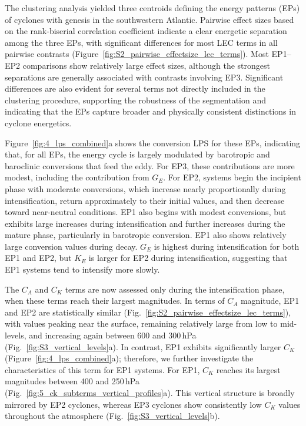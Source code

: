 \documentclass[pdflatex,sn-chicago]{sn-jnl}%
\theoremstyle{plain}
\theoremstyle{definition}
\theoremstyle{remark}
\theoremstyle{definition}
\begin{document}
The clustering analysis yielded three centroids defining the energy patterns (EPs) of cyclones with genesis in the southwestern Atlantic. Pairwise effect sizes based on the rank-biserial correlation coefficient indicate a clear energetic separation among the three EPs, with significant differences for most LEC terms in all pairwise contrasts (Figure~\ref{fig:S2_pairwise_effectsize_lec_terms}). Most EP1--EP2 comparisons show relatively large effect sizes, although the strongest separations are generally associated with contrasts involving EP3. Significant differences are also evident for several terms not directly included in the clustering procedure, supporting the robustness of the segmentation and indicating that the EPs capture broader and physically consistent distinctions in cyclone energetics.

Figure~\ref{fig:4_lps_combined}a shows the conversion LPS for these EPs, indicating that, for all EPs, the energy cycle is largely modulated by barotropic and baroclinic conversions that feed the eddy. For EP3, these contributions are more modest, including the contribution from $G_E$. For EP2, systems begin the incipient phase with moderate conversions, which increase nearly proportionally during intensification, return approximately to their initial values, and then decrease toward near-neutral conditions. EP1 also begins with modest conversions, but exhibits large increases during intensification and further increases during the mature phase, particularly in barotropic conversion. EP1 also shows relatively large conversion values during decay. $G_E$ is highest during intensification for both EP1 and EP2, but $K_E$ is larger for EP2 during intensification, suggesting that EP1 systems tend to intensify more slowly.

The $C_A$ and $C_K$ terms are now assessed only during the intensification phase, when these terms reach their largest magnitudes. In terms of $C_A$ magnitude, EP1 and EP2 are statistically similar (Fig.~\ref{fig:S2_pairwise_effectsize_lec_terms}), with values peaking near the surface, remaining relatively large from low to mid-levels, and increasing again between 600 and 300\,hPa (Fig.~\ref{fig:S3_vertical_levels}a). In contrast, EP1 exhibits significantly larger $C_K$ (Figure~\ref{fig:4_lps_combined}a); therefore, we further investigate the characteristics of this term for EP1 systems. For EP1, $C_K$ reaches its largest magnitudes between 400 and 250\,hPa (Fig.~\ref{fig:5_ck_subterms_vertical_profiles}a). This vertical structure is broadly mirrored by EP2 cyclones, whereas EP3 cyclones show consistently low $C_K$ values throughout the atmosphere (Fig.~\ref{fig:S3_vertical_levels}b).
\end{document}
